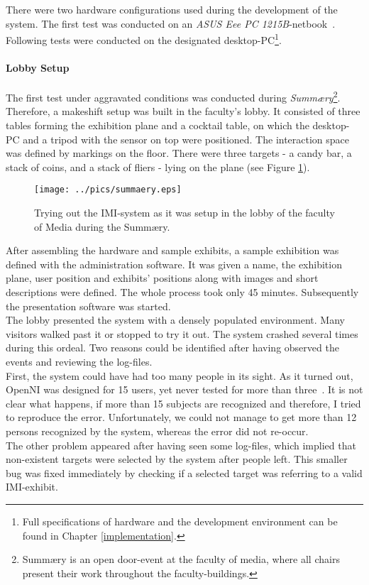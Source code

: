 There were two hardware configurations used during the development of the system. The first test was conducted on an \textit{ASUS Eee PC 1215B}-netbook~\cite{Eee1215B}. Following tests were conducted on the designated desktop-PC\footnote{Full specifications of hardware and the development environment can be found in Chapter \ref{implementation}.}.


\paragraph{Lobby Setup} The first test under aggravated conditions was conducted during \textit{Summ\ae{}ry}\footnote{Summ\ae{}ry is an open door-event at the faculty of media, where all chairs present their work throughout the faculty-buildings.}. Therefore, a makeshift setup was built in the faculty's lobby. It consisted of three tables forming the exhibition plane and a cocktail table, on which the desktop-PC and a tripod with the sensor on top were positioned. The interaction space was defined by markings on the floor. There were three targets - a candy bar, a stack of coins, and a stack of fliers - lying on the plane (see Figure \ref{fig:summaery_setup}).
\begin{figure}[H]%
\texttt{[image: ../pics/summaery.eps]}%
\caption{Trying out the \ac{IMI}-system as it was setup in the lobby of the faculty of Media during the Summ\ae{}ry.}%
\label{fig:summaery_setup} %
\end{figure}

After assembling the hardware and sample exhibits, a sample exhibition was defined with the administration software. It was given a name, the exhibition plane, user position and exhibits' positions along with images and short descriptions were defined. The whole process took only 45 minutes. Subsequently the presentation software was started.
\\
The lobby presented the system with a densely populated environment. Many visitors walked past it or stopped to try it out. The system crashed several times during this ordeal. Two reasons could be identified after having observed the events and reviewing the log-files.
\\
First, the system could have had too many people in its sight. As it turned out, OpenNI was designed for 15 users, yet never tested for more than three~\cite{MaxUsersOpenNI}. It is not clear what happens, if more than 15 subjects are recognized and therefore, I tried to reproduce the error. Unfortunately, we could not manage to get more than 12 persons recognized by the system, whereas the error did not re-occur.
\\
The other problem appeared after having seen some log-files, which implied that non-existent targets were selected by the system after people left. This smaller bug was fixed immediately by checking if a selected target was referring to a valid \ac{IMI}-exhibit. 


